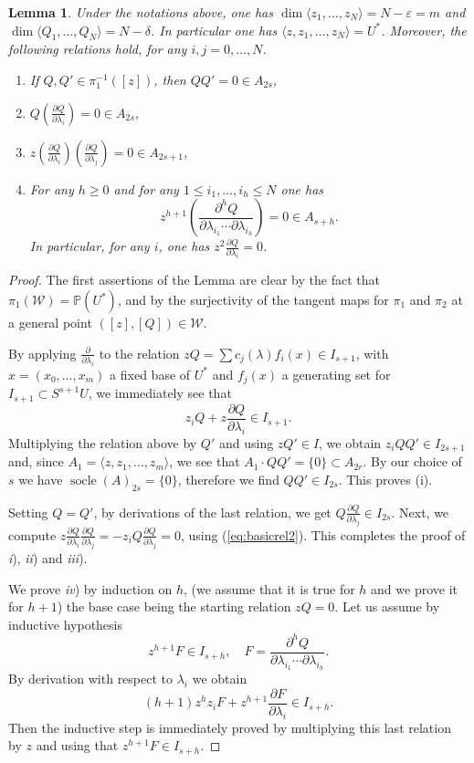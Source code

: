 \documentclass[10pt, a4paper]{amsart}
\theoremstyle{plain}
\newtheorem{lm}[prop]{Lemma}
\theoremstyle{definition}
\theoremstyle{remark}
\def\PP{\mathbb{P}}
\begin{document}
\noindent
\begin{lm}\label{lm:diff} Under the notations above, one has $\dim\langle z_1,\ldots,z_N\rangle=N-\varepsilon=m$ and $\dim\langle Q_1,\ldots,Q_N\rangle=N-\delta$. In particular one has $\langle z, z_1,\ldots,z_N\rangle=U^\ast$.
Moreover, the following relations hold, for any $i,j=0,\ldots,N$.
\begin{enumerate}
\item[\it{i})] If $Q,Q'\in\pi_1^{-1}([z])$, then $QQ'=0\in A_{2s}$,
\item[\it{ii})] $Q\left(\frac{\partial Q}{\partial \lambda_i}\right)=0\in A_{2s}$,
 \item[\it{iii})] $z\left(\frac{\partial Q}{\partial \lambda_i}\right)\left(\frac{\partial Q}{\partial \lambda_j}\right)=0\in A_{2s+1}$,
  \item[\it{iv})] For any $h\geq 0$ and for any $1\leq i_1,\ldots,i_h\leq N$ one has $$z^{h+1}\left(\frac{\partial^h Q}{\partial \lambda_{i_1}\cdots\partial \lambda_{i_h}}\right)=0\in A_{s+h}.$$ In particular, for any $i$, one has $z^2\frac{\partial Q}{\partial \lambda_i}=0$. \end{enumerate}
\end{lm}
\begin{proof}  The first assertions of the Lemma are clear by the fact that $\pi_1(\mathcal{W})=\PP(U^\ast)$, and by the surjectivity of the  tangent maps for $\pi_1$ and $\pi_2$ at a general point $([z],[Q])\in\mathcal{W}$.

By applying $\frac{\partial}{\partial\lambda_i}$ to the relation $zQ=\sum c_j(\lambda)f_i(x)\in I_{s+1}$, with $x=(x_0,\ldots,x_m)$ a fixed base of $U^\ast$ and $f_j(x)$ a generating set for $I_{s+1}\subset S^{s+1}U$,
we immediately see that
\begin{equation}\label{eq:basicrel2}
z_iQ+z\frac{\partial Q}{\partial\lambda_i}\in I_{s+1}.
\end{equation}
Multiplying the relation above by $Q'$ and using $zQ'\in I$, we obtain
$z_iQQ'\in I_{2s+1}$ and, since $A_1=\langle z,z_1,\ldots,z_m\rangle$, we see that $A_1\cdot QQ'=\{0\}\subset A_{2r}$. By our choice of $s$ we have $\operatorname{socle}(A)_{2s}=\{0\}$, therefore we find $QQ'\in I_{2s}$. This proves (i).

Setting $Q=Q'$, by derivations of the last relation, we get $Q\frac{\partial Q}{\partial\lambda_j}\in I_{2s}$.
Next, we compute
$z\frac{\partial Q}{\partial\lambda_i}\frac{\partial Q}{\partial\lambda_j}=-z_iQ\frac{\partial Q}{\partial\lambda_j}=0$, using (\ref{eq:basicrel2}).
This completes the proof of {\it i}), {\it ii}) and {\it iii}). 


We prove {\it iv}) by induction on $h$, (we assume that it is true for $h$ and we prove it for $h+1$) the base case being the starting relation $zQ=0$. Let us assume by inductive hypothesis $$z^{h+1}F\in I_{s+h},\quad F=\frac{\partial^h Q}{\partial \lambda_{i_1}\cdots\partial \lambda_{i_h}}.$$ By derivation with respect to $\lambda_i$ we obtain 
$$(h+1)z^hz_i F+z^{h+1}\frac{\partial F}{\partial\lambda_i}\in I_{s+h}.$$ Then the inductive step is immediately proved by multiplying this last relation by $z$ and using that $z^{h+1}F\in I_{s+h}$.

\end{proof}
\end{document}
